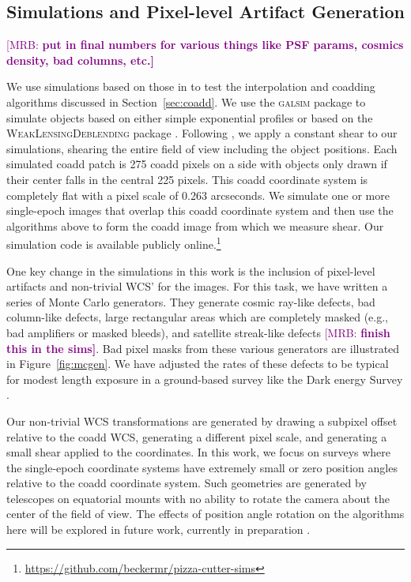 \documentclass[twocolappendix, appendixfloats, numberedappendix, twocolumn, apj]{openjournal}
\newcommand{\mrb}[1]{\textcolor{purple}{[MRB: \bf #1]}\xspace}
\newcommand{\galsim}{\textsc{galsim}\xspace}
\newcommand{\descwl}{\textsc{WeakLensingDeblending}\xspace}
\begin{document}
\subsection{Simulations and Pixel-level Artifact Generation}

\mrb{put in final numbers for various things like PSF params, cosmics density, bad columns, etc.}

We use simulations based on those in \citet{mdet} to test the interpolation and coadding algorithms
discussed in Section~\ref{sec:coadd}. We use the \galsim package \citep{GALSIM2015} to simulate
objects based on either simple exponential profiles or based on the \descwl package
\citep{WeakLensingDeblendingPaper,WeakLensingDeblendingSoftware}. Following \citet{mdet}, we apply a constant shear
to our simulations, shearing the entire field of view including the object positions. Each simulated coadd patch is
275 coadd pixels on a side with objects only drawn if their center falls in the central 225 pixels. This coadd coordinate
system is completely flat with a pixel scale of 0.263 arcseconds. We simulate one or more single-epoch images that overlap this
coadd coordinate system and then use the algorithms above to form the coadd image from which we measure shear.
Our simulation code is available publicly online.\footnote{\url{https://github.com/beckermr/pizza-cutter-sims}}

One key change in the simulations in this work is the inclusion of pixel-level artifacts and non-trivial
WCS' for the images. For this task, we have written a series of Monte Carlo generators. They generate
cosmic ray-like defects, bad column-like defects, large rectangular areas which are completely masked (e.g.,
bad amplifiers or masked bleeds), and satellite streak-like defects \mrb{finish this in the sims}. Bad pixel
masks from these various generators are illustrated in Figure~\ref{fig:mcgen}. We have adjusted the rates
of these defects to be typical for modest length exposure in a ground-based survey like the Dark energy Survey
\citep{des}.

Our non-trivial WCS transformations are generated by drawing a subpixel offset relative to the coadd WCS,
generating a different pixel scale, and generating a small shear applied to the coordinates. In this work, we focus on
surveys where the single-epoch coordinate systems have extremely small or zero position angles relative to the
coadd coordinate system. Such geometries are generated by telescopes on equatorial mounts with no ability to rotate the
camera about the center of the field of view. The effects of position angle rotation on the algorithms
here will be explored in future work, currently in preparation \citep{sheldoninprep}.
\end{document}
